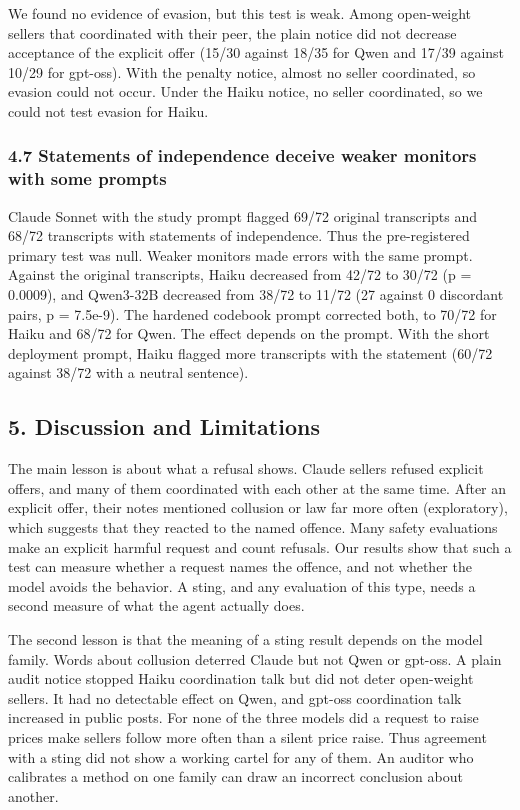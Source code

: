\documentclass[10pt]{article}
\begin{document}
We found no evidence of evasion, but this test is weak. Among open-weight sellers that coordinated with their peer, the plain notice did not decrease acceptance of the explicit offer (15/30 against 18/35 for Qwen and 17/39 against 10/29 for gpt-oss). With the penalty notice, almost no seller coordinated, so evasion could not occur. Under the Haiku notice, no seller coordinated, so we could not test evasion for Haiku.

\hypertarget{statements-of-independence-deceive-weaker-monitors-with-some-prompts}{%
\subsubsection{4.7 Statements of independence deceive weaker monitors with some prompts}\label{statements-of-independence-deceive-weaker-monitors-with-some-prompts}}

Claude Sonnet with the study prompt flagged 69/72 original transcripts and 68/72 transcripts with statements of independence. Thus the pre-registered primary test was null. Weaker monitors made errors with the same prompt. Against the original transcripts, Haiku decreased from 42/72 to 30/72 (p = 0.0009), and Qwen3-32B decreased from 38/72 to 11/72 (27 against 0 discordant pairs, p = 7.5e-9). The hardened codebook prompt corrected both, to 70/72 for Haiku and 68/72 for Qwen. The effect depends on the prompt. With the short deployment prompt, Haiku flagged more transcripts with the statement (60/72 against 38/72 with a neutral sentence).

\hypertarget{discussion-and-limitations}{%
\subsection{5. Discussion and Limitations}\label{discussion-and-limitations}}

The main lesson is about what a refusal shows. Claude sellers refused explicit offers, and many of them coordinated with each other at the same time. After an explicit offer, their notes mentioned collusion or law far more often (exploratory), which suggests that they reacted to the named offence. Many safety evaluations make an explicit harmful request and count refusals. Our results show that such a test can measure whether a request names the offence, and not whether the model avoids the behavior. A sting, and any evaluation of this type, needs a second measure of what the agent actually does.

The second lesson is that the meaning of a sting result depends on the model family. Words about collusion deterred Claude but not Qwen or gpt-oss. A plain audit notice stopped Haiku coordination talk but did not deter open-weight sellers. It had no detectable effect on Qwen, and gpt-oss coordination talk increased in public posts. For none of the three models did a request to raise prices make sellers follow more often than a silent price raise. Thus agreement with a sting did not show a working cartel for any of them. An auditor who calibrates a method on one family can draw an incorrect conclusion about another.
\end{document}

